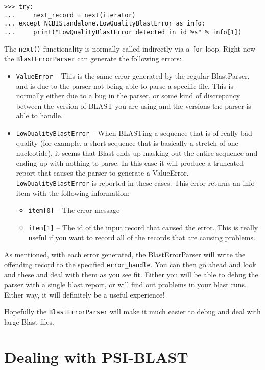 \documentclass{report}
\begin{document}
\begin{verbatim}
>>> try:
...     next_record = next(iterator)
... except NCBIStandalone.LowQualityBlastError as info:
...     print("LowQualityBlastError detected in id %s" % info[1])
\end{verbatim}

The \verb|next()| functionality is normally called indirectly via a \verb|for|-loop.
Right now the \verb|BlastErrorParser| can generate the following errors:

\begin{itemize}
  \item \verb|ValueError| -- This is the same error generated by the regular BlastParser, and is due to the parser not being able to parse a specific file. This is normally either due to a bug in the parser, or some kind of discrepancy between the version of BLAST you are using and the versions the parser is able to handle.

  \item \verb|LowQualityBlastError| -- When BLASTing a sequence that is of really bad quality (for example, a short sequence that is basically a stretch of one nucleotide), it seems that Blast ends up masking out the entire sequence and ending up with nothing to parse. In this case it will produce a truncated report that causes the parser to generate a ValueError. \verb|LowQualityBlastError| is reported in these cases. This error returns an info item with the following information:
  \begin{itemize}
    \item \verb|item[0]| -- The error message
    \item \verb|item[1]| -- The id of the input record that caused the error. This is really useful if you want to record all of the records that are causing problems.
  \end{itemize}
\end{itemize}

As mentioned, with each error generated, the BlastErrorParser will write the offending record to the specified \verb|error_handle|. You can then go ahead and look and these and deal with them as you see fit. Either you will be able to debug the parser with a single blast report, or will find out problems in your blast runs. Either way, it will definitely be a useful experience!

Hopefully the \verb|BlastErrorParser| will make it much easier to debug and deal with large Blast files.

\section{Dealing with PSI-BLAST}
\end{document}
